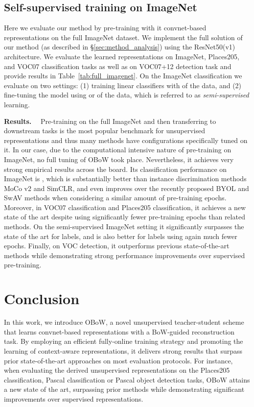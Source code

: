 \documentclass[final]{cvpr}
\newcommand{\parag}[1]{\smallskip\noindent\textbf{#1}~~}
\newcommand{\resnetfifty}{ResNet50\xspace}
\begin{document}
\subsection{Self-supervised training on ImageNet} \label{sec:large_scale_experiments}

Here we evaluate our method by pre-training with it convnet-based representations on the full ImageNet dataset.
We implement the full solution of our method (as described in \S\ref{sec:method_analysis})
using the \resnetfifty (v1)~\cite{he2016deep} architecture.
We evaluate the learned representations on ImageNet, Places205, and VOC07 classification tasks as well as on VOC07+12 detection task and provide results in Table~\ref{tab:full_imagenet}.  
On the ImageNet classification we evaluate on two settings: (1) training linear classifiers with  of the data, and (2) fine-tuning the model using  or  of the data, which is referred to as \emph{semi-supervised} learning.

\parag{Results.}
Pre-training on the full ImageNet and then transferring to downstream tasks is the most popular benchmark for unsupervised representations and thus many methods have configurations specifically tuned on it.
In our case, due to the computational intensive nature of pre-training on ImageNet, no full tuning of 
OBoW took place.
Nevertheless, it achieves very strong empirical results across the board. 
Its classification performance on ImageNet is , which is substantially better than instance discrimination methods MoCo v2 and SimCLR, and even improves over the recently proposed BYOL and SwAV methods when considering a similar amount of pre-training epochs.
Moreover, in VOC07 classification and Places205 classification, it achieves a new state of the art despite using significantly fewer pre-training epochs than related methods.
On the semi-supervised ImageNet setting it significantly surpasses the state of the art for  labels, and is also better for  labels using again much fewer epochs.
Finally, on VOC detection, it outperforms previous state-of-the-art methods while demonstrating strong performance improvements over supervised pre-training.
 \section{Conclusion}

In this work, we introduce OBoW, a novel unsupervised teacher-student scheme that learns convnet-based representations with a BoW-guided reconstruction task.
By employing an efficient fully-online training strategy and promoting the learning of context-aware representations, it delivers strong results that 
surpass prior state-of-the-art approaches on most evaluation protocols.
For instance, when evaluating the derived unsupervised representations on the Places205 classification, Pascal classification or Pascal object detection tasks, OBoW attains a new state of the art, surpassing prior methods while demonstrating significant improvements over supervised representations.
\end{document}
